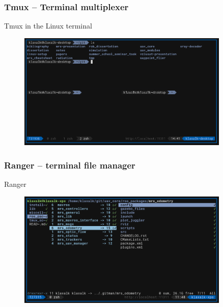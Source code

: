 \documentclass[aspectratio=1610]{beamer}
\begin{document}
  \begin{frame}

    \frametitle{Tmux -- Terminal multiplexer}

    \begin{block}{Tmux in the Linux terminal}
      \begin{figure}
        \includegraphics[width=0.9\textwidth]{./fig/tmux.png}
      \end{figure}
    \end{block}

  \end{frame}



  \begin{frame}

    \frametitle{Ranger -- terminal file manager}

    \begin{block}{Ranger}
      \begin{figure}
        \includegraphics[width=0.9\textwidth]{./fig/ranger.png}
      \end{figure}
    \end{block}

  \end{frame}
\end{document}
